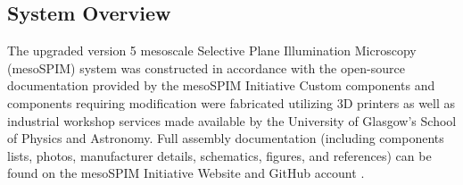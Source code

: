 \subsection{System Overview}
The upgraded version 5 mesoscale Selective Plane Illumination Microscopy (mesoSPIM) system was constructed in accordance with the open-source documentation provided by the mesoSPIM Initiative \cite{voigt_mesospim_2019, vladimirov_benchtop_2024} Custom components and components requiring modification were fabricated utilizing 3D printers as well as industrial workshop services made available by the University of Glasgow’s School of Physics and Astronomy. Full assembly documentation (including components lists, photos, manufacturer details, schematics, figures, and references) can be found on the mesoSPIM Initiative Website and GitHub account \cite{vladimirov_mesospimbenchtop-hardware_2025}.

